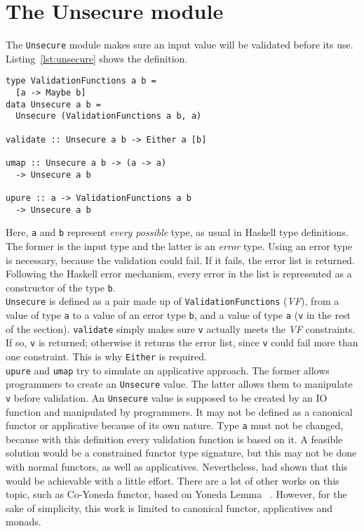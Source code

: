 \section{The Unsecure module}\label{sec:unsecure}
The \texttt{Unsecure} module makes sure an input value will be validated before its use. Listing~\ref{lst:unsecure} shows the definition.

\begin{lstlisting}[caption={Unsecure module}, label={lst:unsecure}]
type ValidationFunctions a b =
  [a -> Maybe b]
data Unsecure a b =  
  Unsecure (ValidationFunctions a b, a)
 
validate :: Unsecure a b -> Either a [b]

umap :: Unsecure a b -> (a -> a) 
  -> Unsecure a b

upure :: a -> ValidationFunctions a b
  -> Unsecure a b
\end{lstlisting}
Here, \texttt{a} and \texttt{b} represent \textit{every possible} type, as usual in Haskell type definitions. The former is the input type and the latter is an \textit{error} type. Using an error type is necessary, because the validation could fail. If it fails, the error list is returned. Following the Haskell error mechanism, every error in the list is represented as a constructor of the type \texttt{b}. \\
\texttt{Unsecure} is defined as a pair made up of \texttt{ValidationFunctions} (\textit{VF}), from a value of type \texttt{a} to a value of an error type \texttt{b}, and a value of type \texttt{a} (\texttt{v} in the rest of the section). \texttt{validate} simply makes sure \texttt{v} actually meets the \textit{VF} constraints. If so, \texttt{v} is returned; otherwise it returns the error list, since \texttt{v} could fail more than one constraint. This is why \texttt{Either} is required. \\
\texttt{upure} and \texttt{umap} try to simulate an applicative approach. The former allows programmers to create an \texttt{Unsecure} value. The latter allows them to manipulate \texttt{v} before validation. An \texttt{Unsecure} value is supposed to be created by an IO function and manipulated by programmers. It may not be defined as a canonical functor or applicative because of its own nature. Type \texttt{a} must not be changed, because with this definition every validation function is based on it. A feasible solution would be a constrained functor type signature, but this may not be done with normal functors, as well as applicatives. Nevertheless, \citeauthor{Sculthorpe:13:ConstrainedMonad} \cite{Sculthorpe:13:ConstrainedMonad} had shown that this would be achievable with a little effort. There are a lot of other works on this topic, such as Co-Yoneda functor, based on Yoneda Lemma \cite{elkins2009calculating}~\cite{yoneda}. However, for the sake of simplicity, this work is limited to canonical functor, applicatives and monads. \\
